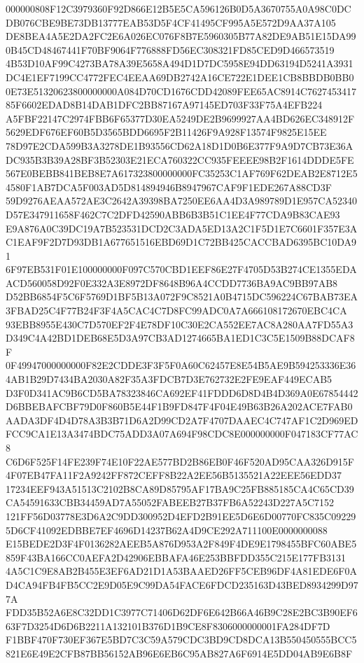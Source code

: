 \documentclass[UTF8,fontset=fandol,zihao=-4,a4paper]{ctexart}
\begin{document}
{{000000808F12C3979360F92D866E12B5E5CA596126B0D5A3670755A0A98C0DCDB076CBE9BE73DB13777EAB53D5F4CF41495CF995A5E572D9AA37A105
DE8BEA4A5E2DA2FC2E6A026EC076F8B7E5960305B77A82DE9AB51E15DA990B45CD48467441F70BF9064F776888FD56EC308321FD85CED9D466573519
4B53D10AF99C4273BA78A39E5658A494D1D7DC5958E94DD63194D5241A3931DC4E1EF7199CC4772FEC4EEAA69DB2742A16CE722E1DEE1CB8BBDB0BB0
0E73E51320623800000000A084D70CD1676CDD42089FEE65AC8914C762745341785F6602EDAD8B14DAB1DFC2BB87167A97145ED703F33F75A4EFB224
A5FBF22147C2974FBB6F65377D30EA5249DE2B9699927AA4BD626EC348912F5629EDF676EF60B5D3565BDD6695F2B11426F9A928F13574F9825E15EE
78D97E2CDA599B3A3278DE1B93556CD62A18D1D0B6E377F9A9D7CB73E36ADC935B3B39A28BF3B52303E21ECA760322CC935FEEEE98B2F1614DDDE5FE
567E0BEBB841BEB8E7A617323800000000FC35253C1AF769F62DEAB2E8712E54580F1AB7DCA5F003AD5D814894946B8947967CAF9F1EDE267A88CD3F
59D9276AEAA572AE3C2642A39398BA7250EE6AA4D3A989789D1E957CA52340D57E347911658F462C7C2DFD42590ABB6B3B51C1EE4F77CDA9B83CAE93
E9A876A0C39DC19A7B523531DCD2C3ADA5ED13A2C1F5D1E7C6601F357E3AC1EAF9F2D7D93DB1A677651516EBD69D1C72BB425CACCBAD6395BC10DA91
6F97EB531F01E100000000F097C570CBD1EEF86E27F4705D53B274CE1355EDAACD560058D92F0E332A3E8972DF8648B96A4CCDD7736BA9AC9BB97AB8
D52BB6854F5C6F5769D1BF5B13A072F9C8521A0B4715DC596224C67BAB73EA3FBAD25C4F77B24F3F4A5CAC4C7D8FC99ADC0A7A666108172670EBC4CA
93EBB8955E430C7D570EF2F4E78DF10C30E2CA552EE7AC8A280AA7FD55A3D349C4A42BD1DEB68E5D3A97CB3AD1274665BA1ED1C3C5E1509B88DCAF8F
0F49947000000000F82E2CDDE3F3F5F0A60C62457E8E54B5AE9B594253336E364AB1B29D7434BA2030A82F35A3FDCB7D3E762732E2FE9EAF449ECAB5
D3F0D341AC9B6CD5BA78323846CA692EF41FDDD6D8D4B4D369A0E67854442D6BBEBAFCBF79D0F860B5E44F1B9FD847F4F04E49B63B26A202ACE7FAB0
AADA3DF4D4D78A3B3B71D6A2D99CD2A7F4707DAAEC4C747AF1C2D969EDFCC9CA1E13A3474BDC75ADD3A07A694F98CDC8E000000000F047183CF77AC8
C6D6F525F14FE239F74E10F22AE577BD2B86EB0F46F520AD95CAA326D915F4F07EB47FA11F2A9242FF872CEFF8B22A2EE56B5135521A22EEE56EDD37
17234EEF943A51513C2102B8CA89D85795AF17BA9C25FB885185CA4C65CD39CA54591633CBB34459AD7A55052FABEEB27B37FB6A52243D227A5C7152
121FF56D03778E3D6A2C9DD300952D4EFD2B91EE5D6E6D00770FC835C092295D6CF41092EDBBE7EF4696D14237B62A4D9CE292A711100E0000000088
E15BEDE2D3F4F0136282AEEB5A876D953A2F849F4DE9E1798455BFC60ABE5859F43BA166CC0AEFA2D42906EBBAFA46E253BBFDD355C215E177FB3131
4A5C1C9E8AB2B455E3EF6AD21D1A53BAAED26FF5CEB96DF4A81EDE6F0AD4CA94FB4FB5CC2E9D05E9C99DA54FACE6FDCD235163D43BED8934299D977A
FDD35B52A6E8C32DD1C3977C71406D62DF6E642B66A46B9C28E2BC3B90EF663F7D3254D6D6B2211A132101B376D1B9CE8F8306000000001FA284DF7D
F1BBF470F730EF367E5BD7C3C59A579CDC3BD9CD8DCA13B550450555BCC5821E6E49E2CFB87BB56152AB96E6EB6C95AB827A6F6914E5DD04AB9E6B8F
}}
\end{document}
